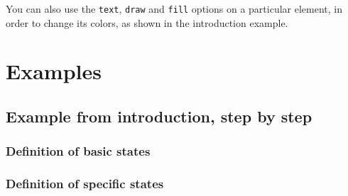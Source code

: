 \documentclass[a4paper,11pt]{report}
\begin{document}
You can also use the {\tt text}, {\tt draw} and {\tt fill} options on a particular element, in order to change its colors, as shown in the introduction example.

\section{Examples}

\subsection{Example from introduction, step by step}

\subsubsection{Definition of basic states}

\medskip

\begin{center}
\end{center}

{\color{red!70!black}
\vspace{-0.37cm}
\vspace{-0.37cm}
\vspace{-0.37cm}
\vspace{-0.37cm}
\vspace{-0.37cm}

}

\vspace{-0.5cm}

\subsubsection{Definition of specific states}

\medskip

\begin{center}
\end{center}

\medskip
\end{document}
